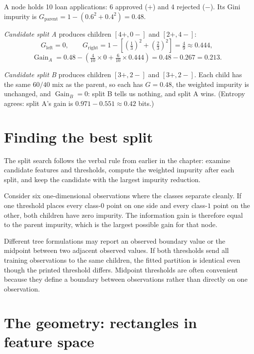\begin{workedexample}
A node holds 10 loan applications: 6 approved ($+$) and 4 rejected ($-$). Its Gini impurity is
$G_{\text{parent}}=1-(0.6^2+0.4^2)=0.48$.

\emph{Candidate split A} produces children $[4+,0-]$ and $[2+,4-]$:
\[
  G_{\text{left}}=0,
  \qquad
  G_{\text{right}}=1-\left[{\left(\tfrac{1}{3}\right)}^2+{\left(\tfrac{2}{3}\right)}^2\right]=\tfrac{4}{9}\approx 0.444,
\]
\[
  \operatorname{Gain}_A
  =0.48-\left(\tfrac{4}{10}\times 0+\tfrac{6}{10}\times 0.444\right)
  =0.48-0.267=0.213.
\]

\emph{Candidate split B} produces children $[3+,2-]$ and $[3+,2-]$. Each child has the same $60/40$ mix as the parent, so each has $G=0.48$, the weighted impurity is unchanged, and $\operatorname{Gain}_B=0$: split B tells us nothing, and split A wins. (Entropy agrees: split A's gain is $0.971-0.551\approx 0.42$ bits.)
\end{workedexample}

\section{Finding the best split}

The split search follows the verbal rule from earlier in the chapter: examine candidate features and thresholds, compute the weighted impurity after each split, and keep the candidate with the largest impurity reduction.

Consider six one-dimensional observations where the classes separate cleanly. If one threshold places every class-$0$ point on one side and every class-$1$ point on the other, both children have zero impurity. The information gain is therefore equal to the parent impurity, which is the largest possible gain for that node.

\begin{libnote}
Different tree formulations may report an observed boundary value or the midpoint between two adjacent observed values. If both thresholds send all training observations to the same children, the fitted partition is identical even though the printed threshold differs. Midpoint thresholds are often convenient because they define a boundary between observations rather than directly on one observation.
\end{libnote}

\section{The geometry: rectangles in feature space}

